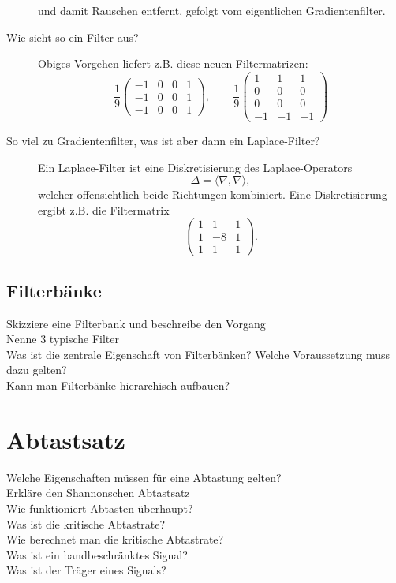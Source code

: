 \begin{description}
      und damit Rauschen entfernt, gefolgt vom eigentlichen Gradientenfilter.\\
	\item[Wie sieht so ein Filter aus?]
      Obiges Vorgehen liefert z.B. diese neuen Filtermatrizen:
      $$ \frac{1}{9}\begin{pmatrix}-1&0&0&1\\-1&0&0&1\\-1&0&0&1\end{pmatrix},\qquad \frac{1}{9}\begin{pmatrix}1&1&1\\0&0&0\\0&0&0\\-1&-1&-1\end{pmatrix}$$
    \item[So viel zu Gradientenfilter, was ist aber dann ein Laplace-Filter?]
      Ein Laplace-Filter ist eine Diskretisierung des Laplace-Operators
      $$ \Delta = \langle \nabla, \nabla \rangle, $$
      welcher offensichtlich beide Richtungen kombiniert. Eine Diskretisierung ergibt z.B. die Filtermatrix
      $$ \begin{pmatrix} 1&1&1\\1&-8&1\\1&1&1 \end{pmatrix}.$$
\end{description}
\subsection{Filterbänke}
\begin{description}
	\item[Skizziere eine Filterbank und beschreibe den Vorgang]
	\item[Nenne 3 typische Filter]
	\item[Was ist die zentrale Eigenschaft von Filterbänken? Welche Voraussetzung muss dazu gelten?]
	\item[Kann man Filterbänke hierarchisch aufbauen?]
\end{description}
\section{Abtastsatz}
\begin{description}
	\item[Welche Eigenschaften müssen für eine Abtastung gelten?]
	\item[Erkläre den Shannonschen Abtastsatz]
	\item[Wie funktioniert Abtasten überhaupt?]
	\item[Was ist die kritische Abtastrate?]
	\item[Wie berechnet man die kritische Abtastrate?]
	\item[Was ist ein bandbeschränktes Signal?]
	\item[Was ist der Träger eines Signals?]
	\end{description}
